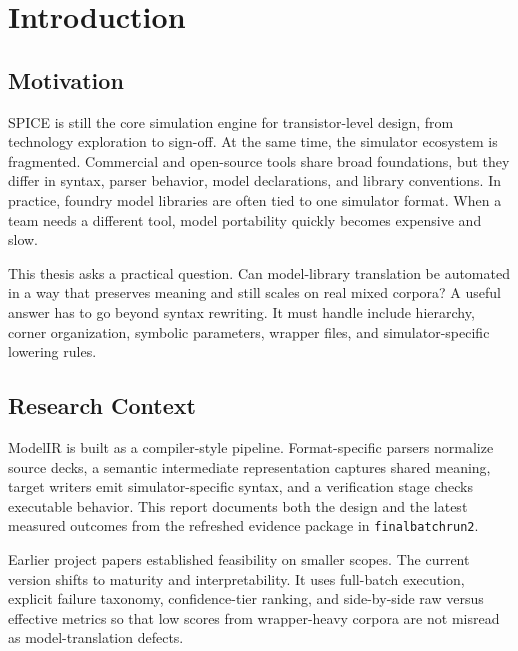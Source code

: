 \documentclass[12pt,a4paper,oneside]{report}
\begin{document}
\clearpage
{}

\chapter{Introduction}

\section{Motivation}
SPICE is still the core simulation engine for transistor-level design, from technology exploration to sign-off. At the same time, the simulator ecosystem is fragmented. Commercial and open-source tools share broad foundations, but they differ in syntax, parser behavior, model declarations, and library conventions. In practice, foundry model libraries are often tied to one simulator format. When a team needs a different tool, model portability quickly becomes expensive and slow.

This thesis asks a practical question. Can model-library translation be automated in a way that preserves meaning and still scales on real mixed corpora? A useful answer has to go beyond syntax rewriting. It must handle include hierarchy, corner organization, symbolic parameters, wrapper files, and simulator-specific lowering rules.

\section{Research Context}
ModelIR is built as a compiler-style pipeline. Format-specific parsers normalize source decks, a semantic intermediate representation captures shared meaning, target writers emit simulator-specific syntax, and a verification stage checks executable behavior. This report documents both the design and the latest measured outcomes from the refreshed evidence package in \texttt{finalbatchrun2}.

Earlier project papers established feasibility on smaller scopes. The current version shifts to maturity and interpretability. It uses full-batch execution, explicit failure taxonomy, confidence-tier ranking, and side-by-side raw versus effective metrics so that low scores from wrapper-heavy corpora are not misread as model-translation defects.
\end{document}
